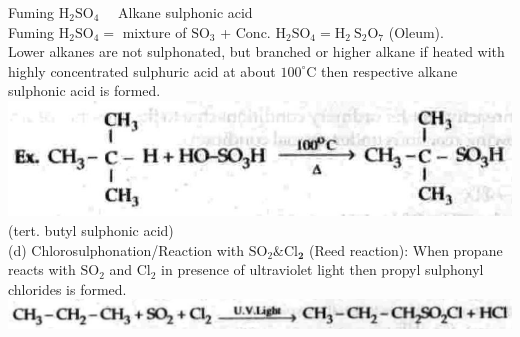 \documentclass[10pt]{article}
\begin{document}
Fuming $\mathrm{H}_{2} \mathrm{SO}_{4} \quad$ Alkane sulphonic acid\\
Fuming $\mathrm{H}_{2} \mathrm{SO}_{4}=$ mixture of $\mathrm{SO}_{3}$ + Conc. $\mathrm{H}_{2} \mathrm{SO}_{4}=\mathrm{H}_{2} \mathrm{~S}_{2} \mathrm{O}_{7}$ (Oleum).\\
Lower alkanes are not sulphonated, but branched or higher alkane if heated with highly concentrated sulphuric acid at about $100^{\circ} \mathrm{C}$ then respective alkane sulphonic acid is formed.\\
\includegraphics[max width=\textwidth, center]{2025_01_28_8470952b98110cec3aabg-174}\\
(tert. butyl sulphonic acid)\\
(d) Chlorosulphonation/Reaction with $\mathrm{SO}_{2} \& \mathrm{Cl}_{\mathbf{2}}$ (Reed reaction): When propane reacts with $\mathrm{SO}_{2}$ and $\mathrm{Cl}_{2}$ in presence of ultraviolet light then propyl sulphonyl chlorides is formed.\\
\includegraphics[max width=\textwidth, center]{2025_01_28_8470952b98110cec3aabg-174(2)}
\end{document}
